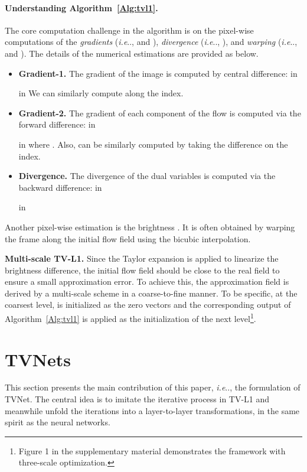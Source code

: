 \documentclass[10pt,twocolumn,letterpaper]{article}
\makeatletter
\DeclareRobustCommand\onedot{\futurelet\@let@token\@onedot}
\def\@onedot{\ifx\@let@token.\else.\null\fi\xspace}
\def\ie{\emph{i.e}\onedot} \def\Ie{\emph{I.e}\onedot}
\makeatother
\begin{document}
\paragraph{Understanding Algorithm~\ref{Alg:tvl1}.} The core computation challenge in the algorithm is on the pixel-wise computations of  the \emph{gradients} (\ie,  and ), \emph{divergence} (\ie, ), and \emph{warping} (\ie,  and ).
The details of the numerical estimations are provided as below.
\begin{itemize}
  \item \textbf{Gradient-1.} The gradient of the image  is computed by central difference:
   in
  
   in \noindent
  We can similarly compute  along the  index.
  \item \textbf{Gradient-2.} The gradient of each component of the flow  is computed via the forward difference:
   in
  
   in \noindent
  where . Also,  can be similarly computed by taking the difference on the  index.
  \item \textbf{Divergence.} The divergence of the dual variables  is computed via the backward difference:
   in
  
   in \noindent
\end{itemize}
Another pixel-wise estimation is the brightness  . It is often obtained  by warping the frame  along the initial flow field  using the bicubic interpolation.


\textbf{Multi-scale TV-L1.} Since the Taylor expansion is applied to linearize the brightness difference, the initial flow field  should be close to the real field  to ensure a small approximation error. To achieve this, the approximation field  is derived by a multi-scale scheme in a coarse-to-fine manner. To be specific, at the coarsest level,  is initialized as the zero vectors and the corresponding output of Algorithm~\ref{Alg:tvl1} is applied as the initialization of the next level\footnote{Figure 1 in the supplementary material demonstrates the framework with three-scale optimization.}.


 \section{TVNets}
\label{Sec:tvnet}
This section presents the main contribution of this paper, \ie, the formulation of TVNet.
The central idea is to imitate the  iterative process in TV-L1 and meanwhile unfold the iterations into a layer-to-layer transformations, in the same spirit as the neural networks.
\end{document}
